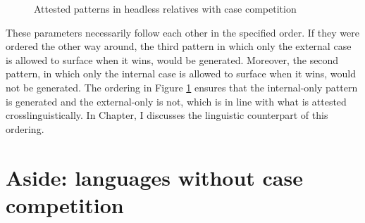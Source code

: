 \begin{figure}[H]
  \centering
    \footnotesize{
    }
    \caption{Attested patterns in headless relatives with case competition}
    \label{fig:attested-headless-relatives-case-competition}
\end{figure}

These parameters necessarily follow each other in the specified order. If they were ordered the other way around, the third pattern in which only the external case is allowed to surface when it wins, would be generated. Moreover, the second pattern, in which only the internal case is allowed to surface when it wins, would not be generated. The ordering in Figure \ref{fig:attested-headless-relatives-case-competition} ensures that the internal-only pattern is generated and the external-only is not, which is in line with what is attested crosslinguistically. In Chapter, I discusses the linguistic counterpart of this ordering.


\section{Aside: languages without case competition}\label{sec:without-case-competition}

